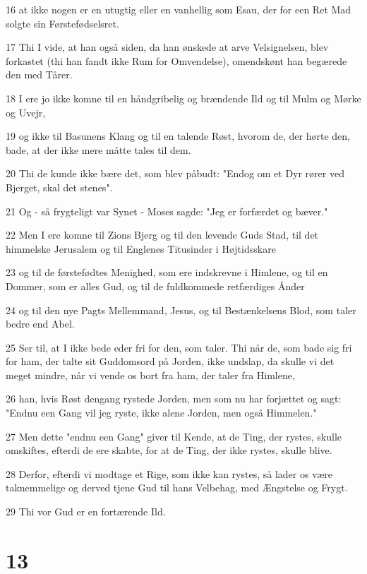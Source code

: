 \par 16 at ikke nogen er en utugtig eller en vanhellig som Esau, der for een Ret Mad solgte sin Førstefødselsret.
\par 17 Thi I vide, at han også siden, da han ønskede at arve Velsignelsen, blev forkastet (thi han fandt ikke Rum for Omvendelse), omendskønt han begærede den med Tårer.
\par 18 I ere jo ikke komne til en håndgribelig og brændende Ild og til Mulm og Mørke og Uvejr,
\par 19 og ikke til Basunens Klang og til en talende Røst, hvorom de, der hørte den, bade, at der ikke mere måtte tales til dem.
\par 20 Thi de kunde ikke bære det, som blev påbudt: "Endog om et Dyr rører ved Bjerget, skal det stenes".
\par 21 Og - så frygteligt var Synet - Moses sagde: "Jeg er forfærdet og bæver."
\par 22 Men I ere komne til Zions Bjerg og til den levende Guds Stad, til det himmelske Jerusalem og til Englenes Titusinder i Højtidsskare
\par 23 og til de førstefødtes Menighed, som ere indskrevne i Himlene, og til en Dommer, som er alles Gud, og til de fuldkommede retfærdiges Ånder
\par 24 og til den nye Pagts Mellemmand, Jesus, og til Bestænkelsens Blod, som taler bedre end Abel.
\par 25 Ser til, at I ikke bede eder fri for den, som taler. Thi når de, som bade sig fri for ham, der talte sit Guddomsord på Jorden, ikke undslap, da skulle vi det meget mindre, når vi vende os bort fra ham, der taler fra Himlene,
\par 26 han, hvis Røst dengang rystede Jorden, men som nu har forjættet og sagt: "Endnu een Gang vil jeg ryste, ikke alene Jorden, men også Himmelen."
\par 27 Men dette "endnu een Gang" giver til Kende, at de Ting, der rystes, skulle omskiftes, efterdi de ere skabte, for at de Ting, der ikke rystes, skulle blive.
\par 28 Derfor, efterdi vi modtage et Rige, som ikke kan rystes, så lader os være taknemmelige og derved tjene Gud til hans Velbehag, med Ængstelse og Frygt.
\par 29 Thi vor Gud er en fortærende Ild.

\chapter{13}

